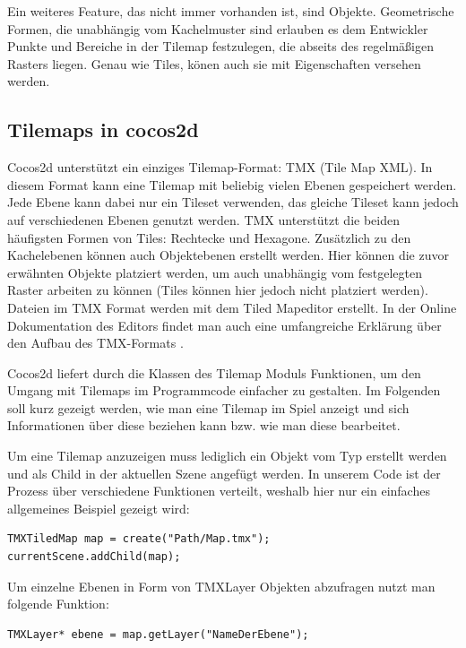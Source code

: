 Ein weiteres Feature, das nicht immer vorhanden ist, sind Objekte. Geometrische Formen, die unabhängig vom Kachelmuster sind erlauben es dem Entwickler Punkte und Bereiche in der Tilemap festzulegen, die abseits des regelmäßigen Rasters liegen. Genau wie Tiles, könen auch sie mit Eigenschaften versehen werden.

\subsection{Tilemaps in cocos2d}
Cocos2d unterstützt ein einziges Tilemap-Format: TMX (Tile Map XML). In diesem Format kann eine Tilemap mit beliebig vielen Ebenen gespeichert werden. Jede Ebene kann dabei nur ein Tileset verwenden, das gleiche Tileset kann jedoch auf verschiedenen Ebenen genutzt werden. TMX unterstützt die beiden häufigsten Formen von Tiles: Rechtecke und Hexagone. 
Zusätzlich zu den Kachelebenen können auch Objektebenen erstellt werden. Hier können die zuvor erwähnten Objekte platziert werden, um auch unabhängig vom festgelegten Raster arbeiten zu können (Tiles können hier jedoch nicht platziert werden).
Dateien im TMX Format werden mit dem Tiled Mapeditor erstellt. In der Online Dokumentation des Editors findet man auch eine umfangreiche Erklärung über den Aufbau des TMX-Formats \cite{TiledDocFormat}.

Cocos2d liefert durch die Klassen des Tilemap Moduls Funktionen, um den Umgang mit Tilemaps im Programmcode einfacher zu gestalten. Im Folgenden soll kurz gezeigt werden, wie man eine Tilemap im Spiel anzeigt und sich Informationen über diese beziehen kann bzw. wie man diese bearbeitet.

Um eine Tilemap anzuzeigen muss lediglich ein Objekt vom Typ  erstellt werden und als Child in der aktuellen Szene angefügt werden. In unserem Code ist der Prozess über verschiedene Funktionen verteilt, weshalb hier nur ein einfaches allgemeines Beispiel gezeigt wird:

\begin{lstlisting}[style=singleline]
TMXTiledMap map = create("Path/Map.tmx");
currentScene.addChild(map);
\end{lstlisting}

Um einzelne Ebenen in Form von TMXLayer Objekten abzufragen nutzt man folgende Funktion:

\begin{lstlisting}[style=singleline]
TMXLayer* ebene = map.getLayer("NameDerEbene");
\end{lstlisting}

